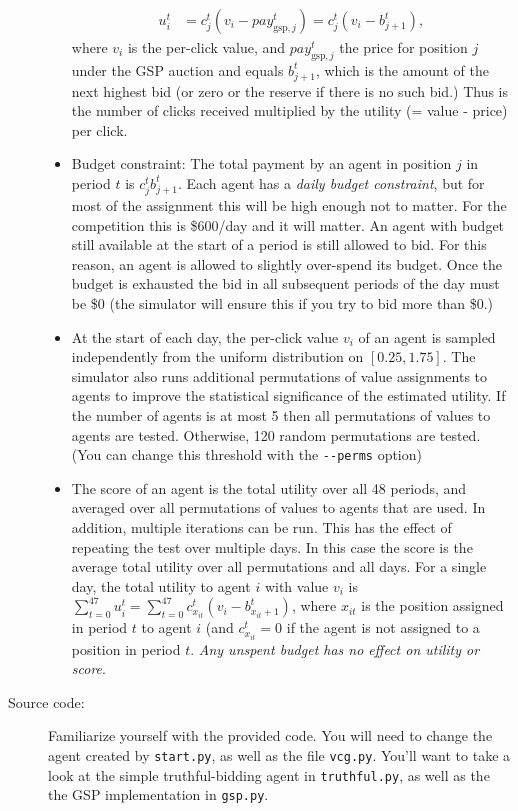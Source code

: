 \documentclass[11pt]{article}
\begin{document}
\begin{description}
\begin{itemize}
\begin{align}
u_i^t &=  c^t_j(v_i - \mathit{pay}_{\mathrm{gsp},j}^t) = c^t_j(v_i - b^t_{j+1}),
\end{align}
%
where $v_i$ is the per-click value,
and $\mathit{pay}^t_{\mathrm{gsp},j}$ the
price for position $j$ under the GSP auction and equals
$b^t_{j+1}$, which
is the amount of the next highest
bid (or zero
or the reserve if there
is no such bid.)
Thus is the number of clicks received multiplied by the
utility (= value - price) per click.
%
%				
\item Budget constraint: The total payment by an agent in position $j$
  in period $t$ is $c_j^t b^t_{j+1}$. Each agent has a {\em daily
    budget constraint}, but for most of the assignment this will be
  high enough not to matter. For the competition this is \$600/day and
  it will matter.
 An agent  with budget still available at the start
of a period is still allowed to bid. For this reason, an
agent  is allowed to slightly over-spend its budget.
Once the budget is exhausted the
bid in all
subsequent periods  of the day
must be \$0 (the
  simulator will ensure this if you try to bid more than \$0.)
%				
\item At the start of each day, the per-click value $v_i$ of an agent
  is sampled independently from the uniform distribution on
  $[0.25,1.75]$.  The simulator also runs additional permutations of
  value assignments to agents to improve the statistical
  significance of the estimated utility.
If the number of agents is at most 5 then
all permutations
 of values to agents
are tested. Otherwise,
  120 random permutations are tested. (You can change this threshold
  with the \verb+--perms+ option)
%
\item The score of an agent is the total utility over all 48 periods,
  and averaged over all permutations of values to agents that are
  used.  In addition, multiple iterations can be run. This has the
  effect of repeating the test over multiple days.  In this case the
  score is the average total utility over all permutations and all
  days.  For a single day, the total utility to agent $i$ with value
  $v_i$ is $\sum_{t=0}^{47} u_i^t = \sum_{t=0}^{47} c_{x_{it}}^t(v_i -
  b_{x_{it}+1}^t)$, where $x_{it}$ is the position assigned in period $t$ to agent $i$ (and
  $c_{x_{it}}^t=0$ if the agent is not assigned to a position in period $t$.
{\em Any unspent  budget has no effect on utility or score}.
			\end{itemize}
%
		\item[Source code:] Familiarize yourself with the provided code. You will need to change the agent created by \verb+start.py+, as well as the file \verb+vcg.py+. You'll want to take a look at the simple truthful-bidding agent in \verb+truthful.py+, as well as the the GSP implementation in \verb+gsp.py+.


\end{description}
\end{document}

